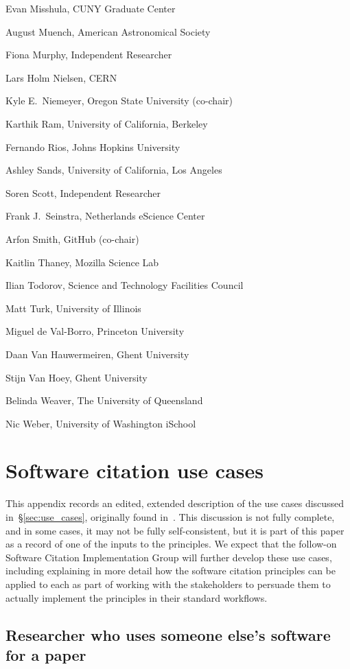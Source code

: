 \documentclass[12pt, oneside]{amsart}
\begin{document}
Evan Misshula, CUNY Graduate Center

August Muench, American Astronomical Society

Fiona Murphy, Independent Researcher

Lars Holm Nielsen, CERN

Kyle E.~Niemeyer, Oregon State University (co-chair)

Karthik Ram, University of California, Berkeley

Fernando Rios, Johns Hopkins University

Ashley Sands, University of California, Los Angeles

Soren Scott, Independent Researcher

Frank J.~Seinstra, Netherlands eScience Center

Arfon Smith, GitHub (co-chair)

Kaitlin Thaney, Mozilla Science Lab

Ilian Todorov, Science and Technology Facilities Council

Matt Turk, University of Illinois

Miguel de Val-Borro, Princeton University

Daan Van Hauwermeiren, Ghent University

Stijn Van Hoey, Ghent University

Belinda Weaver, The University of Queensland

Nic Weber, University of Washington iSchool

\section{Software citation use cases}
\label{app:usecases}

This appendix records an edited, extended description of the use cases
discussed in~\S\ref{sec:use_cases}, originally found in~\cite{SC-Use-Cases}.
This discussion is not fully complete, and in some cases, it may not be fully
self-consistent, but it is part of this paper as a record of one of the inputs
to the principles. We expect that the follow-on Software Citation
Implementation Group will further develop these use cases, including explaining
in more detail how the software citation principles can be applied
to each as part of working with the stakeholders to persuade them to actually
implement the principles in their standard workflows.


\subsection{Researcher who uses someone else's software for a paper}
\end{document}
